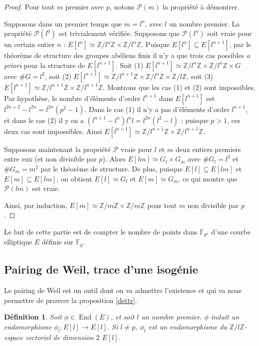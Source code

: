 \documentclass{article}
\theoremstyle{plain}%
\newtheorem{deff}[thm]{Définition}
\theoremstyle{definition}%
\newcommand{\F}{\mathbb{F}}
\newcommand{\Z}{\mathbb{Z}}
\DeclareMathOperator{\End}{End}
\begin{document}
\begin{proof}
  Pour tout $m$ premier avec $p$, notons $\mathcal P(m)$ la propriété à démontrer.

  Supposons dans un premier temps que $m=l^n$, avec $l$ un nombre premier. La propriété $\mathcal P(l^0)$ est trivialement vérifiée. Supposons que $\mathcal P(l^n)$ soit vraie pour un certain entier $n$ : $E[l^n] \simeq \Z/l^n\Z \times \Z/l^n\Z$. Puisque $E[l^n] \subseteq E[l^{n+1}]$, par le théorème de structure des groupes abéliens finis il n'y a que trois cas possibles \emph{a priori} pour la structure de $E[l^{n+1}]$. Soit (1)   $E[l^{n+1}]  \simeq \Z/l^n\Z \times \Z/l^n\Z \times G$ avec $\#G=l^2$, soit (2)   $E[l^{n+1}]  \simeq \Z/l^{n+1}\Z \times \Z/l^n\Z\times \Z/l\Z$, soit (3) $E[l^{n+1}]  \simeq \Z/l^{n+1}\Z \times \Z/l^{n+1}\Z$. Montrons que les cas (1) et (2) sont impossibles. Par hypothèse, le nombre d'éléments d'ordre $l^{n+1}$ dans $E[l^{n+1}]$ est $l^{2n+2} - l^{2n} = l^{2n}(p^2 -1)$. Dans le cas (1) il n'y a pas d'éléments d'ordre $l^{n+1}$, et dans le cas (2) il y en a $(l^{n+1} - l^n)l^nl = l^{2n}(l^2-l)$ : puisque $p>1$, ces deux cas sont impossibles. Ainsi $E[l^{n+1}]  \simeq \Z/l^{n+1}\Z \times \Z/l^{n+1}\Z$.

  Supposons maintenant la propriété $\mathcal P$ vraie pour $l$ et $m$ deux entiers premiers entre eux (et non divisible par $p$). Alors $E[lm]\simeq G_l \times G_m$ avec $\#G_l = l^2$ et $\#G_m = m^2$ par le théorème de structure. De plus, puisque $E[l]\subseteq E[lm]$ et  $E[m]\subseteq E[lm]$, on obtient $E[l]\simeq G_l$ et $E[m]\simeq G_m$, ce qui montre que $\mathcal P(lm)$ est vraie.

  Ainsi, par induction, $E[m] \simeq {\Z}/{m\Z} \times  {\Z}/{m\Z}$ pour tout $m$ non divisible par $p$.
\end{proof}



Le but de cette partie est de compter le nombre de points dans $\F_{q^n}$ d'une courbe elliptique $E$ définie sur $\F_q$.

\subsection{Pairing de Weil, trace d'une isogénie}

Le pairing de Weil est un outil dont on va admettre l'existence et qui va nous permettre de prouver la proposition \ref{dettr}.
\begin{deff}
  Soit $\phi\in \End(E)$, et soit $l$ un nombre premier. $\phi$ induit un endomorphisme $\phi_l : E[l] \to E[l]$. Si $l\neq p$, $\phi_l$ est un endomorphisme du $\Z/l\Z$-espace vectoriel de dimension $2$ $E[l]$. 
\end{deff}
\end{document}
